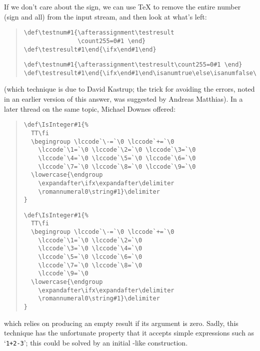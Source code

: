 If we don't care about the sign, we can use \TeX{} to remove the
entire number (sign and all) from the input stream, and then look at
what's left:
\begin{quote}
\begin{narrowversion}
\begin{verbatim}
\def\testnum#1{\afterassignment\testresult
               \count255=0#1 \end}
\def\testresult#1\end{\ifx\end#1\end}
\end{verbatim}
\end{narrowversion}
\begin{wideversion}
\begin{verbatim}
\def\testnum#1{\afterassignment\testresult\count255=0#1 \end}
\def\testresult#1\end{\ifx\end#1\end\isanumtrue\else\isanumfalse\fi}
\end{verbatim}
\end{wideversion}
\end{quote}
(which technique is due to David Kastrup; the trick for avoiding the
errors, noted in an earlier version of this answer, was suggested by
Andreas Matthias).
In a later thread on the same topic, Michael Downes offered:
\begin{quote}
\begin{wideversion}
\begin{verbatim}
\def\IsInteger#1{%
  TT\fi
  \begingroup \lccode`\-=`\0 \lccode`+=`\0
    \lccode`\1=`\0 \lccode`\2=`\0 \lccode`\3=`\0
    \lccode`\4=`\0 \lccode`\5=`\0 \lccode`\6=`\0
    \lccode`\7=`\0 \lccode`\8=`\0 \lccode`\9=`\0
  \lowercase{\endgroup
    \expandafter\ifx\expandafter\delimiter
    \romannumeral0\string#1}\delimiter
}
\end{verbatim}
\end{wideversion}
\begin{narrowversion}
\begin{verbatim}
\def\IsInteger#1{%
  TT\fi
  \begingroup \lccode`\-=`\0 \lccode`+=`\0
    \lccode`\1=`\0 \lccode`\2=`\0
    \lccode`\3=`\0 \lccode`\4=`\0
    \lccode`\5=`\0 \lccode`\6=`\0
    \lccode`\7=`\0 \lccode`\8=`\0
    \lccode`\9=`\0
  \lowercase{\endgroup
    \expandafter\ifx\expandafter\delimiter
    \romannumeral0\string#1}\delimiter
}
\end{verbatim}
\end{narrowversion}
\end{quote}
which relies on  producing an empty result if its
argument is zero.  Sadly, this technique has the unfortunate property
that it accepts simple expressions such as `\texttt{1+2-3}'; this
could be solved by an initial -like construction.


